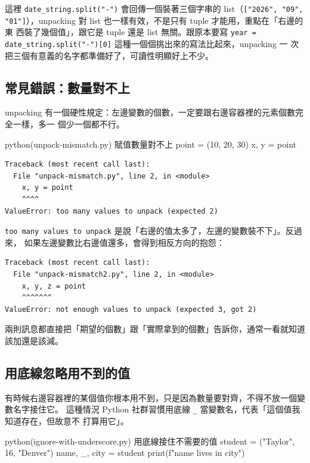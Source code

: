 
這裡 \texttt{date\_string.split("-")} 會回傳一個裝著三個字串的 list（\texttt{["2026",
"09", "01"]}），unpacking 對 list 也一樣有效，不是只有 tuple 才能用，重點在「右邊的東
西裝了幾個值」，跟它是 tuple 還是 list 無關。跟原本要寫
\texttt{year = date\_string.split("-")[0]} 這種一個個挑出來的寫法比起來，unpacking 一
次把三個有意義的名字都準備好了，可讀性明顯好上不少。

\subsection*{常見錯誤：數量對不上}

unpacking 有一個硬性規定：左邊變數的個數，一定要跟右邊容器裡的元素個數完全一樣，多一
個少一個都不行。

\begin{example}{python}{(unpack-mismatch.py) 賦值數量對不上}
point = (10, 20, 30)
x, y = point
\end{example}

\begin{verbatim}
Traceback (most recent call last):
  File "unpack-mismatch.py", line 2, in <module>
    x, y = point
    ^^^^
ValueError: too many values to unpack (expected 2)
\end{verbatim}

\texttt{too many values to unpack} 是說「右邊的值太多了，左邊的變數裝不下」。反過來，
如果左邊變數比右邊值還多，會得到相反方向的抱怨：

\begin{verbatim}
Traceback (most recent call last):
  File "unpack-mismatch2.py", line 2, in <module>
    x, y, z = point
    ^^^^^^^
ValueError: not enough values to unpack (expected 3, got 2)
\end{verbatim}

兩則訊息都直接把「期望的個數」跟「實際拿到的個數」告訴你，通常一看就知道該加還是該減。

\subsection*{用底線忽略用不到的值}

有時候右邊容器裡的某個值你根本用不到，只是因為數量要對齊，不得不放一個變數名字接住它。
這種情況 Python 社群習慣用底線 \texttt{\_} 當變數名，代表「這個值我知道存在，但故意不
打算用它」。

\begin{example}{python}{(ignore-with-underscore.py) 用底線接住不需要的值}
student = ("Taylor", 16, "Denver")
name, _, city = student
print(f"{name} lives in {city}")
\end{example}

